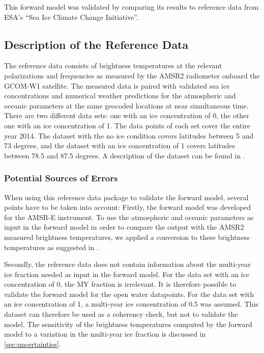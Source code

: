 \documentclass[11pt, a4paper]{article}
\begin{document}
This forward model was validated by comparing its results to reference data from ESA's ``Sea Ice Climate Change Initiative''.



\subsection{Description of the Reference Data}

The reference data consists of brightness temperatures at the relevant polarizations and frequencies as measured by the AMSR2 radiometer onboard the GCOM-W1 satellite. The measured data is paired with validated sea ice concentrations and numerical weather predictions for the atmospheric and oceanic parameters at the same geocoded locations at near simultaneous time. There are two different data sets: one with an ice concentration of 0, the other one with an ice concentration of 1. The data points of each set cover the entire year 2014. The dataset with the no ice condition covers latitudes between 5 and 73 degrees, and the dataset with an ice concentration of 1 covers latitudes between 78.5 and 87.5 degrees. A description of the dataset can be found in \cite{Wink2}.

\subsubsection{Potential Sources of Errors}
\label{sec:RefDat}
When using this reference data package to validate the forward model, several points have to be taken into account: Firstly, the forward model was developed for the AMSR-E instrument. To use the atmospheric and oceanic parameters as input in the forward model in order to compare the output with the AMSR2 measured brightness temperatures, we applied a conversion to these brightness temperatures as suggested in \cite{secret}.
\newline

Secondly, the reference data does not contain information about the multi-year ice fraction needed as input in the forward model. For the data set with an ice concentration of 0, the MY fraction is irrelevant. It is therefore possible to validate the forward model for the open water datapoints. For the data set with an ice concentration of 1, a multi-year ice concentration of 0.5 was assumed. This dataset can therefore be used as a coherency check, but not to validate the model. The sensitivity of the brightness temperatures computed by the forward model to a variation in the multi-year ice fraction is discussed in \ref{sec:uncertainties}.
\newline
\end{document}
